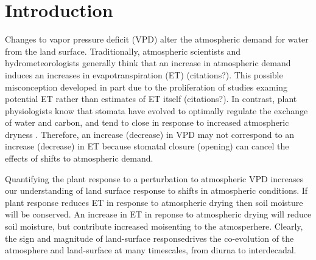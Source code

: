 \documentclass[draft,linenumbers]{agujournal}
\begin{document}

%
% 
% 
% 


\section{Introduction}


Changes to vapor pressure deficit (VPD) alter the atmospheric demand for water from the land surface. Traditionally, atmospheric scientists and hydrometeorologists generally think that an increase in atmospheric demand induces an increases in evapotranspiration (ET) (citations?). This possible misconception developed in part due to the proliferation of studies examing potential ET rather than estimates of ET itself (citations?).  In contrast, plant physiologists know that stomata have evolved to optimally regulate the exchange of water and carbon, and tend to close in response to increased atmospheric dryness \citep{Ball_1987, Leuning_1990, MEDLYN_2011}.  Therefore, an increase (decrease) in VPD may not correspond to an increase (decrease) in ET because stomatal closure (opening) can cancel the effects of shifts to atmospheric demand. 

Quantifying the plant response to a perturbation to atmospheric VPD increases our understanding of land surface response to shifts in atmospheric conditions. If plant response reduces ET in response to atmospheric drying then soil moisture will be conserved. An increase in ET in reponse to atmospheric drying will reduce soil moisture, but contribute increased moisenting to the atmosperhere. Clearly, the sign and magnitude of land-surface responsedrives the co-evolution of the atmosphere and land-surface at many timescales, from diurna to interdecadal.
\end{document}
